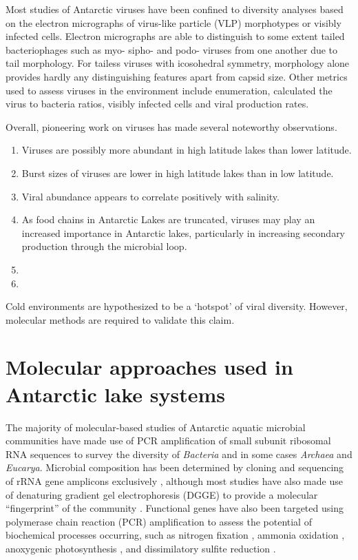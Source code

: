 Most studies of Antarctic viruses have been confined to diversity analyses based on the electron micrographs of virus-like particle (VLP) morphotypes or visibly infected cells. 
Electron micrographs are able to distinguish to some extent tailed bacteriophages such as myo- sipho- and podo- viruses from one another due to tail morphology.
For tailess viruses with icosohedral symmetry, morphology alone provides hardly any distinguishing features apart from capsid size.
Other metrics used to assess viruses in the environment include enumeration, calculated the virus to bacteria ratios, visibly infected cells and viral production rates.

Overall, pioneering work on viruses has made several noteworthy observations. 
\begin{enumerate}
\item Viruses are possibly more abundant in high latitude lakes than lower latitude.
\item Burst sizes of viruses are lower in high latitude lakes than in low latitude.
\item Viral abundance appears to correlate positively with salinity.
\item As food chains in Antarctic Lakes are truncated, viruses may play an increased importance in Antarctic lakes, particularly in increasing secondary production through the microbial loop.
\item %
\item %
\end{enumerate}

Cold environments are hypothesized to be a `hotspot' of viral diversity.
However, molecular methods are required to validate this claim.


\section{Molecular approaches used in Antarctic lake systems}
\label{in:mol}
The majority of molecular-based studies of Antarctic aquatic microbial communities have made use of PCR amplification of small subunit ribosomal RNA sequences to survey the diversity of \emph{Bacteria}
 and in some cases \emph{Archaea} and \emph{Eucarya}. %
Microbial composition has been determined by cloning and sequencing of rRNA gene amplicons exclusively 
\cite{Bowman2000a, Bowman2000, Gordon2000, Christner2001, Purdy2003, Karr2006, Matsuzaki2006, Kurosawa2010, Bielewicz2011}, 
although most studies have also made use of denaturing gradient gel electrophoresis (DGGE) to provide a molecular ``fingerprint'' of the community 
\cite{Pearce2003, Pearce2003, Karr2005, Pearce2005, Pearce2005, Unrein2005, Glatz2006, Mikucki2007, Mosier2007, Schiaffino2009, Villaescusa2010}.
Functional genes have also been targeted using polymerase chain reaction (PCR) amplification to assess the potential of biochemical processes occurring, such as nitrogen fixation \cite{Olsen1998}, 
ammonia oxidation \cite{Voytek1999}, anoxygenic photosynthesis \cite{Karr2003}, and dissimilatory sulfite reduction \cite{Karr2005, Mikucki2009}. %

